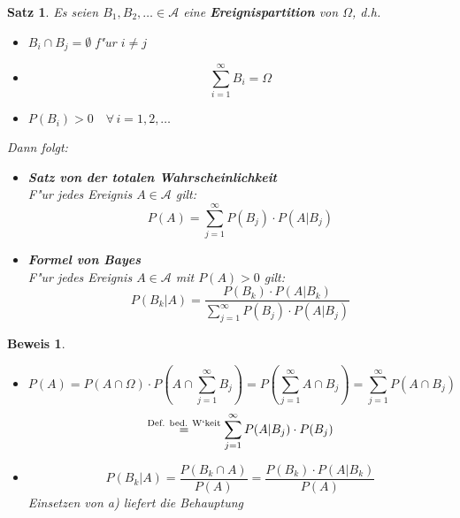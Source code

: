 \documentclass[a4paper,11pt]{book}
\def\AA{ \mathcal{A} }
\newtheorem{Sa}{Satz}[chapter]
\theoremstyle{nonumberplain}
\newtheorem{Bew}{Beweis}
\begin{document}
\begin{Sa}
Es seien $B_1,B_2,\ldots \in \AA$ eine \textbf{Ereignispartition} von $\Omega$, d.h.
\begin{itemize}
	\item [(i)] $B_i\cap B_j=\emptyset$ f"ur $i\neq j$
	\item [(ii)] \[\sum_{i=1}^\infty B_i = \Omega\]
	\item [(iii)] $P(B_i)>0 \quad\forall\, i=1,2,\ldots$
\end{itemize}
Dann folgt:
\begin{itemize}
	\item [a)] \textbf{Satz von der totalen Wahrscheinlichkeit}\\
	F"ur jedes Ereignis $A\in \AA$ gilt:\\
	\[P(A)=\sum_{j=1}^\infty P(B_j)\cdot P(A|B_j)\]
	\item [b)] \textbf{Formel von Bayes}\\
	F"ur jedes Ereignis $A \in \AA$ mit $P(A)>0$ gilt:
	\[P(B_k|A)=\frac{P(B_k)\cdot P(A|B_k)}{\sum_{j=1}^\infty P(B_j)\cdot P(A|B_j)}\]
\end{itemize}
\end{Sa}

\begin{Bew}
\begin{itemize}
	\item [a)] \[P(A)=P(A\cap\Omega) \cdot P(A\cap\sum_{j=1}^\infty B_j)= P(\sum_{j=1}^\infty A\cap B_j)=\sum_{j=1}^\infty P(A\cap B_j)\]
\[\stackrel{\textnormal{Def. bed. W`keit}}{=}\sum_{j=1}^\infty P(A|B_j)\cdot P(B_j)\]
	\item [b)] \[P(B_k|A)=\frac{P(B_k\cap A)}{P(A)}=\frac{P(B_k)\cdot P(A|B_k)}{P(A)}\]
	Einsetzen von a) liefert die Behauptung
\end{itemize}
\end{Bew}
\end{document}

